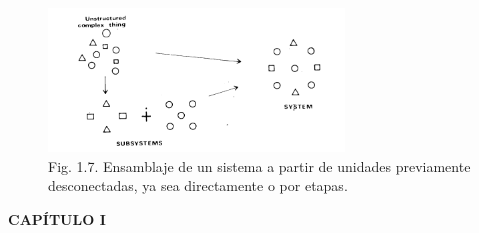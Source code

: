 \begin{figure}[h!]
    \centering
    \includegraphics[width=0.7\textwidth]{imagenes/figura1.7.png}
    \caption*{Fig. 1.7. Ensamblaje de un sistema a partir de unidades previamente desconectadas, ya sea directamente o por etapas.}
\end{figure}

\newpage
\fancyhf{}
\fancyhead[l]{\thepage}
\begin{center}
{\fontsize{13}{16}\selectfont \textbf{CAPÍTULO I}}
\end{center}
\vspace{0.5cm}

